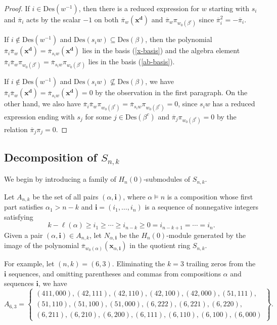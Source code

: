 \documentclass[ALCO,ThmDefs,published]{cedram}
\newcommand{\xx}{{\mathbf {x}}}
\theoremstyle{plain}
\newcommand{\Des}{{\mathrm {Des}}}
\newcommand{\xx}{{\mathbf {x}}}
\newcommand{\ii}{{\mathbf{i}}}
\newcommand{\dd}{{\mathbf {d}}}
\newcommand{\pib}{\overline{\pi}}
\begin{document}
\begin{proof}
If $i \in \Des(w^{-1})$, then there is a reduced
expression for $w$ starting with $s_i$ and
 $\pib_i$ acts by the scalar $-1$ on both $\pib_w(\xx^{\dd})$
and $\pib_w \pi_{w_0(\beta^c)}$ since $\pib_i^2=-\pib_i$.

If $i \notin \Des(w^{-1})$ and $\Des(s_i w) \subseteq \Des(\beta)$, then 
the polynomial $\pib_i \pib_w (\xx^{\dd}) = \pib_{s_i w}(\xx^{\dd})$ lies in the basis (\ref{x-basis})
and the algebra element $\pib_i \pib_w \pi_{w_0(\beta^c)} = \pib_{s_i w} \pi_{w_0(\beta^c)}$
lies in the basis (\ref{ab-basis}).

If $i \notin \Des(w^{-1})$ and $\Des(s_i w) \not\subseteq \Des(\beta)$, we have 
$\pib_i \pib_w (\xx^{\dd}) = \pib_{s_i w} (\xx^{\dd}) = 0$ by the observation in the first paragraph.
On the other hand, we also have $\pib_i \pib_w \pi_{w_0(\beta^c)} = \pib_{s_iw}\pi_{w_0(\beta^c)} = 0$, since $s_iw$ has a reduced expression ending with $s_j$ for some $j\in\Des(\beta^c)$ and $\pib_j\pi_{w_0(\beta^c)}=0$ by the relation $\pib_j\pi_j=0$.
\end{proof}




\subsection{Decomposition of $S_{n,k}$}
We begin by introducing a family of $H_n(0)$-submodules of $S_{n,k}$.

\begin{defn}
Let $A_{n,k}$ be the set of all pairs $(\alpha, \ii)$, where $\alpha \models n$ 
is a composition whose first part satisfies $\alpha_1> n-k$
and $\ii = (i_1, \dots, i_n)$ is a sequence of nonnegative integers satisfying 
\begin{equation*}
k - \ell(\alpha) \geq i_1 \geq \cdots \geq i_{n-k} \geq 0 = i_{n-k+1} = \cdots = i_n.
\end{equation*}
Given a pair $(\alpha, \ii) \in A_{n,k}$, let $N_{\alpha,\ii}$ be the $H_n(0)$-module
generated by the image of the polynomial $\pib_{w_0(\alpha)}(\xx_{\alpha,\ii})$ in the quotient ring $S_{n,k}$.
\end{defn}

For example, let $(n,k) = (6,3)$.  Eliminating the $k = 3$ trailing zeros from the $\ii$ sequences, and omitting
parentheses and commas from compositions $\alpha$ and sequences $\ii$, we have
\begin{equation*}
A_{6,3} = \left\{ 
\begin{matrix}
(411, 000), (42, 111), (42, 110), (42, 100), (42, 000),
(51, 111), \\
(51, 110), (51, 100), (51,000), (6, 222), (6,221), (6,220), \\
(6,211),(6,210), (6,200), (6,111), (6,110), (6,100), (6,000)
\end{matrix}
 \right\}.
\end{equation*}
\end{document}
